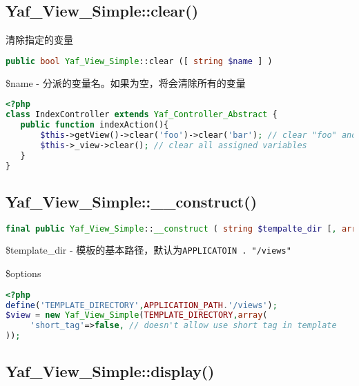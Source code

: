 \subsection{Yaf\_View\_Simple::clear()}

清除指定的变量

\begin{lstlisting}[language=PHP]
public bool Yaf_View_Simple::clear ([ string $name ] )
\end{lstlisting}

\begin{compactitem}
\item \$name - 分派的变量名。如果为空，将会清除所有的变量
\end{compactitem}



\begin{lstlisting}[language=PHP]
<?php
class IndexController extends Yaf_Controller_Abstract {
   public function indexAction(){
       $this->getView()->clear('foo')->clear('bar'); // clear "foo" and "bar"
       $this->_view->clear(); // clear all assigned variables
   }
}
\end{lstlisting}


\subsection{Yaf\_View\_Simple::\_\_construct()}


\begin{lstlisting}[language=PHP]
final public Yaf_View_Simple::__construct ( string $tempalte_dir [, array $options ] )
\end{lstlisting}


\begin{compactitem}
\item \$template\_dir - 模板的基本路径，默认为\texttt{APPLICATOIN . "/views"}
\item \$options
\end{compactitem}


\begin{lstlisting}[language=PHP]
<?php
define('TEMPLATE_DIRECTORY',APPLICATION_PATH.'/views');
$view = new Yaf_View_Simple(TEMPLATE_DIRECTORY,array(
     'short_tag'=>false, // doesn't allow use short tag in template
));
\end{lstlisting}



\subsection{Yaf\_View\_Simple::display()}


